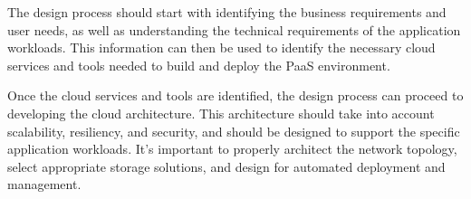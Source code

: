 The design process should start with identifying the business requirements and user needs, as well as understanding the technical requirements of the application workloads. This information can then be used to identify the necessary cloud services and tools needed to build and deploy the PaaS environment. 

Once the cloud services and tools are identified, the design process can proceed to developing the cloud architecture. This architecture should take into account scalability, resiliency, and security, and should be designed to support the specific application workloads. It's important to properly architect the network topology, select appropriate storage solutions, and design for automated deployment and management.